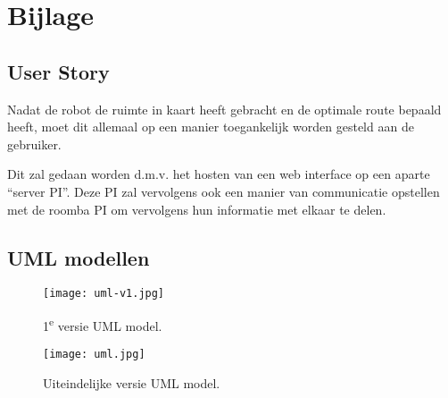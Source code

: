 \newpage
\section{Bijlage}

\subsection*{User Story}
Nadat de robot de ruimte in kaart heeft gebracht en de optimale route bepaald
heeft, moet dit allemaal op een manier toegankelijk worden gesteld aan de
gebruiker.

Dit zal gedaan worden d.m.v. het hosten van een web interface op een aparte
“server PI”. Deze PI zal vervolgens ook een manier van communicatie opstellen
met de roomba PI om vervolgens hun informatie met elkaar te delen.

\subsection*{UML modellen}
\label{ssec:uml model voor de api server}
\begin{figure}[H]
    \texttt{[image: uml-v1.jpg]}
    \caption{1\textsuperscript{e} versie UML model.}
    \label{fig:umlv1}
\end{figure}

\newpage

\begin{figure}[H]
    \texttt{[image: uml.jpg]}
    \caption{Uiteindelijke versie UML model.}
    \label{fig:uml}
\end{figure}

\newpage
